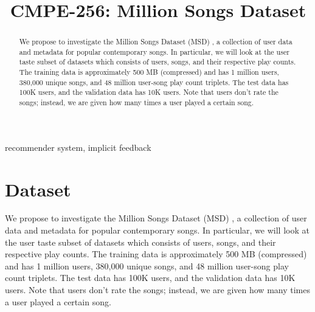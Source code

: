 \documentclass[conference]{IEEEtran}
\begin{document}
\title{\textsc{CMPE-256}: Million Songs Dataset}
\date{}

\author{
\and 
{}
\and 
{}
}

\maketitle

\begin{abstract}
We propose to investigate the Million Songs Dataset (MSD) \cite{bertin2011million},
a collection of user data and metadata for popular contemporary songs. In particular, we will look at the user taste subset of datasets which consists of users, songs, and their respective play counts. The training data is approximately 500 MB (compressed) and has 1 million users, 380,000 unique songs, and 48 million user-song play count triplets. The test data has 100K users, and the validation data has 10K users. Note that users don't rate the songs; instead, we are given how many times a user played a certain song.
\end{abstract}

\begin{IEEEkeywords}
recommender system, implicit feedback
\end{IEEEkeywords}

\section{Dataset}

We propose to investigate the Million Songs Dataset (MSD) \cite{bertin2011million},
a collection of user data and metadata for popular contemporary songs. In particular, we will look at the user taste subset of datasets which consists of users, songs, and their respective play counts. The training data is approximately 500 MB (compressed) and has 1 million users, 380,000 unique songs, and 48 million user-song play count triplets. The test data has 100K users, and the validation data has 10K users. Note that users don't rate the songs; instead, we are given how many times a user played a certain song.
\end{document}
